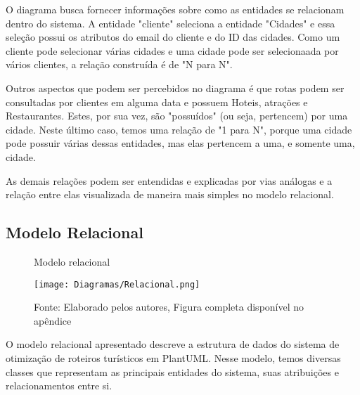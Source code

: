 O diagrama busca fornecer informações sobre como as entidades se relacionam dentro do sistema. A entidade "cliente" seleciona a entidade "Cidades" e essa seleção possui os atributos do email do cliente e do ID das cidades. Como um cliente pode selecionar várias cidades e uma cidade pode ser selecionaada por vários clientes, a relação construída é de "N para N". 

Outros aspectos que podem ser percebidos no diagrama é que rotas podem ser consultadas por clientes em alguma data e possuem Hoteis, atrações e Restaurantes. Estes, por sua vez, são "possuídos" (ou seja, pertencem) por uma cidade. Neste último caso, temos uma relação de "1 para N", porque uma cidade pode possuir várias dessas entidades, mas elas pertencem a uma, e somente uma, cidade. 

As demais relações podem ser entendidas e explicadas por vias análogas e a relação entre elas visualizada de maneira mais simples no modelo relacional. 



\subsection{Modelo Relacional}


\begin{figure}[H]
    \centering
    \caption{Modelo relacional}
    \label{fig:DER}
    \texttt{[image: Diagramas/Relacional.png]}\\
    \caption*{Fonte: Elaborado pelos autores, Figura completa disponível no apêndice}
\end{figure}

O modelo relacional apresentado descreve a estrutura de dados do sistema de otimização de roteiros turísticos em PlantUML. Nesse modelo, temos diversas classes que representam as principais entidades do sistema, suas atribuições e relacionamentos entre si.

